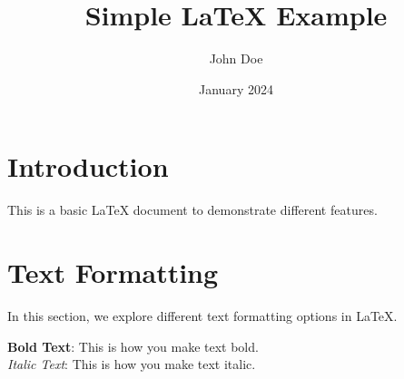 \documentclass{article}
\title{Simple LaTeX Example}
\author{John Doe}
\date{January 2024}
\begin{document}
\maketitle

\section{Introduction}
This is a basic LaTeX document to demonstrate different features. 

\section{Text Formatting}
In this section, we explore different text formatting options in LaTeX.

\textbf{Bold Text}: This is how you make text bold. \\
\textit{Italic Text}: This is how you make text italic. \\
\end{document}
